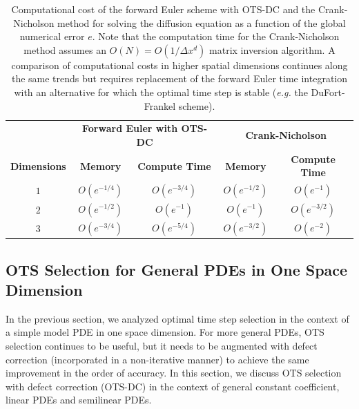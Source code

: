 \documentclass[fleqn,12pt,twoside]{article}
\def\dx{\Delta x}
\def\eg{\emph{e.g. }}
\begin{document}
\begin{table}[tb]
\caption{
Computational cost of the forward Euler scheme with OTS-DC and
the Crank-Nicholson method for solving the diffusion equation as a function 
of the global numerical error $e$.
Note that the computation time for the Crank-Nicholson method assumes an 
$O(N) = O \left( 1/\dx^d \right)$ matrix inversion algorithm. 
A comparison of computational costs in higher spatial dimensions continues 
along the same trends but requires replacement of the forward Euler time 
integration with an alternative for which the optimal time step is stable 
(\eg the DuFort-Frankel scheme). 
}
\label{tab:comp_perf_vs_dim}
\renewcommand{\arraystretch}{1.5}
\centering
\begin{tabular}{ccccc}
  \hline
  & \multicolumn{2}{c}{\bf Forward Euler with OTS-DC} 
  & \multicolumn{2}{c}{\bf Crank-Nicholson} \\
  \cline{2-3} \cline{4-5} 
    {\bf Dimensions} & {\bf Memory} & {\bf Compute Time} 
  & {\bf Memory} & {\bf Compute Time} \\
  \hline 
  $1$ & $O\left( e^{-1/4} \right)$ 
      & $O\left( e^{-3/4} \right)$ 
      & $O\left( e^{-1/2} \right)$ 
      & $O\left( e^{-1} \right)$ \\ 
  $2$ & $O\left( e^{-1/2} \right)$ 
      & $O\left( e^{-1} \right)$ 
      & $O\left( e^{-1} \right)$ 
      & $O\left( e^{-3/2} \right)$ \\ 
  $3$ & $O\left( e^{-3/4} \right)$ 
      & $O\left( e^{-5/4} \right)$ 
      & $O\left( e^{-3/2} \right)$ 
      & $O\left( e^{-2} \right)$ \\
  \hline 
\end{tabular}
\end{table}


\subsection{\label{sec:ots_dc_general_1d_pdes} 
            OTS Selection for General PDEs in One Space Dimension} 
In the previous section, we analyzed optimal time step selection in the 
context of a simple model PDE in one space dimension.  For more general PDEs, 
OTS selection continues to be useful, but it needs to be augmented with 
defect correction (incorporated in a non-iterative manner) to achieve 
the same improvement in the order of accuracy.  In this section, we discuss 
OTS selection with defect correction (OTS-DC) in the context of general
constant coefficient, linear PDEs and semilinear PDEs. 
\end{document}

